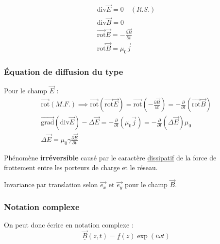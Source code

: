 \begin{gather}
  \mathrm{div} \overrightarrow{E} = 0 \quad (R.S.) \\ 
  \mathrm{div} \overrightarrow{B} = 0 \\
  \overrightarrow{\mathrm{rot}} \overrightarrow{E}= - \frac{\partial \overrightarrow{B}}{\partial t}  \\ 
  \overrightarrow{\mathrm{rot}} \overrightarrow{B} = \mu_0 \overrightarrow{j}
\end{gather}

\subsubsection{Équation de diffusion du type} %
\label{sec:Équation de diffusion du type}

Pour le champ $\overrightarrow{E}$ : 
\begin{gather}
  \overrightarrow{\mathrm{rot}} (M.F.) \implies \overrightarrow{\mathrm{rot}}(\overrightarrow{\mathrm{rot}} \overrightarrow{E}) = \overrightarrow{\mathrm{rot}} \left( - \frac{\partial \overrightarrow{B}}{\partial t}  \right) = - \frac{\partial }{\partial t} (\overrightarrow{\mathrm{rot}} \overrightarrow{B}) \\
   \overrightarrow{\mathrm{grad}}(\mathrm{div} \overrightarrow{E}) - \Delta \overrightarrow{E} = - \frac{\partial }{\partial t} (\mu_0 \overrightarrow{j} ) = - \frac{\partial }{\partial t} (\Delta \overrightarrow{E}) \mu_0 \\ 
   \boxed{\Delta \overrightarrow{E} = \mu_0 \gamma \frac{\partial \overrightarrow{E}}{\partial t} }
\end{gather}

Phénomène \textbf{irréversible} causé par le caractère \underline{dissipatif} de la force de frottement entre les porteurs de charge et le réseau.

Invariance par translation selon $\overrightarrow{e_x}$ et $\overrightarrow{e_y}$ pour le champ $\overrightarrow{B}$. 

\subsubsection{Notation complexe} %
\label{sec:Notation complexe}

On peut donc écrire en notation complexe : 
\begin{equation}
  \underline{\overrightarrow{B}}(z,t) = \underline{f}(z) \exp(i \omega t)
\end{equation}
